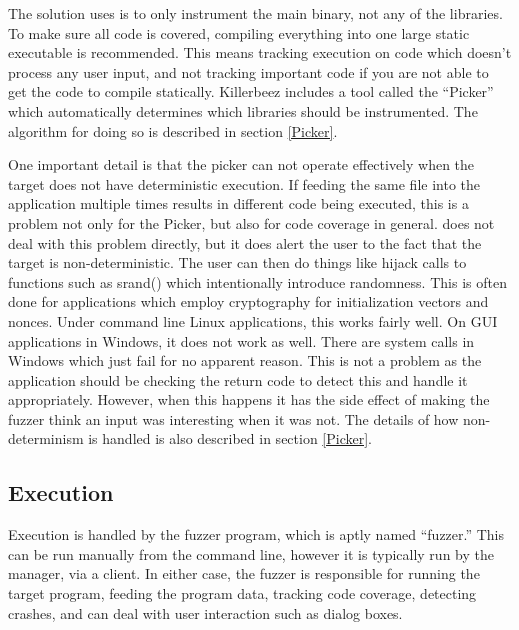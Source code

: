\begin{multicols}{2}
The solution \AFL{} uses is to only instrument the main binary, not any of the
libraries. To make sure all code is covered, compiling everything into one
large static executable is recommended. This means tracking execution on code
which doesn't process any user input, and not tracking important code if you
are not able to get the code to compile statically. Killerbeez includes a tool
called the ``Picker'' which automatically determines which libraries should be
instrumented.  The algorithm for doing so is described in section \ref{Picker}.

One important detail is that the picker can not operate effectively when the
target does not have deterministic execution.  If feeding the same file into
the application multiple times results in different code being executed, this
is a problem not only for the Picker, but also for code coverage in general.
\AFL{} does not deal with this problem directly, but it does alert the user to
the fact that the target is non-deterministic. The user can then do things like
hijack calls to functions such as srand() which intentionally introduce
randomness. This is often done for applications which employ cryptography for
initialization vectors and nonces. Under command line Linux applications, this
works fairly well.  On GUI applications in Windows, it does not work as well.
There are system calls in Windows which just fail for no apparent reason. This
is not a problem as the application should be checking the return code to
detect this and handle it appropriately.  However, when this happens it has the
side effect of making the fuzzer think an input was interesting when it was
not.  The details of how non-determinism is handled is also described in
section \ref{Picker}.

\subsection{Execution}
Execution is handled by the fuzzer program, which is aptly named ``fuzzer.''
This can be run manually from the command line, however it is typically run by
the manager, via a \BOINC{} client.  In either case, the fuzzer is responsible
for running the target program, feeding the program data, tracking code
coverage, detecting crashes, and can deal with user interaction such as dialog
boxes.

\end{multicols}
